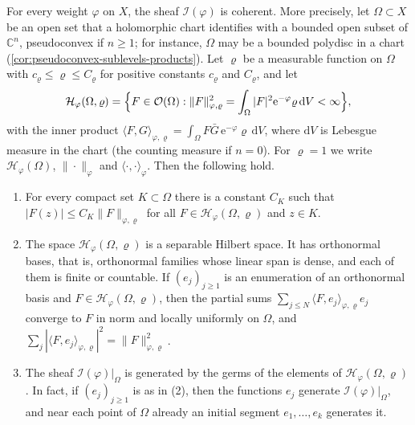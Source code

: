\begin{theorem}\label{thm:multiplier-ideal-coherence}
For every weight $\varphi$ on $X$, the sheaf $\mathcal I(\varphi)$ is coherent. More precisely, let $\Omega\subset X$ be an open set that a holomorphic chart identifies with a bounded open subset of $\mathbb C^n$, pseudoconvex if $n\geq1$; for instance, $\Omega$ may be a bounded polydisc in a chart (\cref{cor:pseudoconvex-sublevels-products}). Let $\varrho$ be a measurable function on $\Omega$ with $c_\varrho\leq\varrho\leq C_\varrho$ for positive constants $c_\varrho$ and $C_\varrho$, and let
\[
 \mathcal H_\varphi(\Omega,\varrho)=\Bigl\{F\in\mathcal O(\Omega):
             \|F\|_{\varphi,\varrho}^2=\int_\Omega|F|^2\mathrm e^{-\varphi}\varrho\,\mathrm dV<\infty\Bigr\},
\]
with the inner product $\langle F,G\rangle_{\varphi,\varrho}=\int_\Omega F\bar G\,\mathrm e^{-\varphi}\varrho\,\mathrm dV$, where $\mathrm dV$ is Lebesgue measure in the chart (the counting measure if $n=0$). For $\varrho=1$ we write $\mathcal H_\varphi(\Omega)$, $\|\cdot\|_\varphi$ and $\langle\cdot,\cdot\rangle_\varphi$. Then the following hold.
\begin{enumerate}
\item For every compact set $K\subset\Omega$ there is a constant $C_K$ such that $|F(z)|\leq C_K\|F\|_{\varphi,\varrho}$ for all $F\in\mathcal H_\varphi(\Omega,\varrho)$ and $z\in K$.
\item The space $\mathcal H_\varphi(\Omega,\varrho)$ is a separable Hilbert space. It has orthonormal bases, that is, orthonormal families whose linear span is dense, and each of them is finite or countable. If $(e_j)_{j\geq1}$ is an enumeration of an orthonormal basis and $F\in\mathcal H_\varphi(\Omega,\varrho)$, then the partial sums $\sum_{j\leq N}\langle F,e_j\rangle_{\varphi,\varrho}e_j$ converge to $F$ in norm and locally uniformly on $\Omega$, and $\sum_j|\langle F,e_j\rangle_{\varphi,\varrho}|^2=\|F\|_{\varphi,\varrho}^2$.
\item The sheaf $\mathcal I(\varphi)|_\Omega$ is generated by the germs of the elements of $\mathcal H_\varphi(\Omega,\varrho)$. In fact, if $(e_j)_{j\geq1}$ is as in (2), then the functions $e_j$ generate $\mathcal I(\varphi)|_\Omega$, and near each point of $\Omega$ already an initial segment $e_1,\ldots,e_k$ generates it.
\end{enumerate}
\end{theorem}
